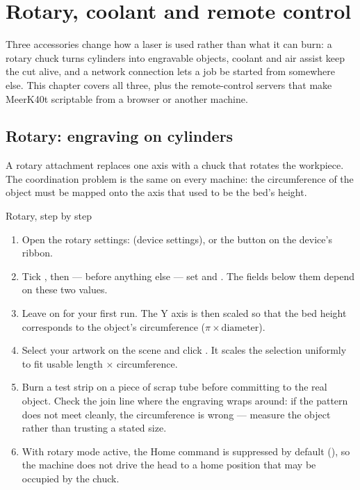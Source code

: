 \chapter{Rotary, coolant and remote control}
\label{ch:remote}

Three accessories change how a laser is used rather than what it can burn: a
rotary chuck turns cylinders into engravable objects, coolant and air assist keep
the cut alive, and a network connection lets a job be started from somewhere else.
This chapter covers all three, plus the remote-control servers that make MeerK40t
scriptable from a browser or another machine.

\section{Rotary: engraving on cylinders}

A rotary attachment replaces one axis with a chuck that rotates the workpiece.
The coordination problem is the same on every machine: the circumference of the
object must be mapped onto the axis that used to be the bed's height.

\begin{walkthrough}{Rotary, step by step}
\begin{enumerate}[label=\arabic*.,leftmargin=1.4em]
  \item Open the rotary settings:  (device settings), or the
         button on the device's ribbon.
  \item Tick , then --- before anything else --- set
         and . The fields
        below them depend on these two values.
  \item Leave  on for your first run. The Y axis
        is then scaled so that the bed height corresponds to the object's
        circumference ($\pi \times \text{diameter}$).
  \item Select your artwork on the scene and click .
        It scales the selection uniformly to fit usable length $\times$
        circumference.
  \item Burn a test strip on a piece of scrap tube before committing to the real
        object. Check the join line where the engraving wraps around: if the
        pattern does not meet cleanly, the circumference is wrong --- measure the
        object rather than trusting a stated size.
  \item With rotary mode active, the Home command is suppressed by default
        (), so the machine does not drive the head to a
        home position that may be occupied by the chuck.
\end{enumerate}
\end{walkthrough}

